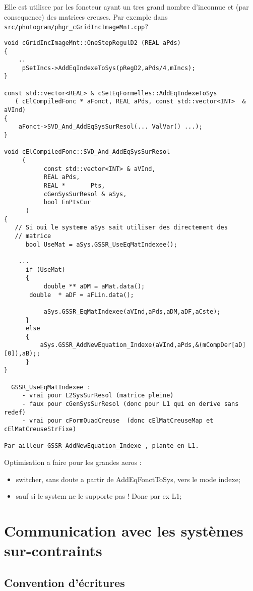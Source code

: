 Elle est utilisee par les foncteur ayant un tres grand nombre d'inconnue
et (par consequence) des matrices creuses. Par exemple dans
{\tt src/photogram/phgr\_cGridIncImageMnt.cpp}?


{\small
\begin{verbatim}
void cGridIncImageMnt::OneStepRegulD2 (REAL aPds)
{
    ..
     pSetIncs->AddEqIndexeToSys(pRegD2,aPds/4,mIncs);
}

const std::vector<REAL> & cSetEqFormelles::AddEqIndexeToSys
   ( cElCompiledFonc * aFonct, REAL aPds, const std::vector<INT>  & aVInd)
{
    aFonct->SVD_And_AddEqSysSurResol(... ValVar() ...);
}

void cElCompiledFonc::SVD_And_AddEqSysSurResol
     (
           const std::vector<INT> & aVInd,
           REAL aPds,
           REAL *       Pts,
           cGenSysSurResol & aSys,
           bool EnPtsCur
      )
{
   // Si oui le systeme aSys sait utiliser des directement des
   // matrice
      bool UseMat = aSys.GSSR_UseEqMatIndexee();

    ...
      if (UseMat)
      {
           double ** aDM = aMat.data();
	   double  * aDF = aFLin.data();

           aSys.GSSR_EqMatIndexee(aVInd,aPds,aDM,aDF,aCste);
      }
      else
      {
          aSys.GSSR_AddNewEquation_Indexe(aVInd,aPds,&(mCompDer[aD][0]),aB);;
      }
}

  GSSR_UseEqMatIndexee :
     - vrai pour L2SysSurResol (matrice pleine)
     - faux pour cGenSysSurResol (donc pour L1 qui en derive sans redef)
     - vrai pour cFormQuadCreuse  (donc cElMatCreuseMap et cElMatCreuseStrFixe)

Par ailleur GSSR_AddNewEquation_Indexe , plante en L1.
\end{verbatim}
}

Optimisation a faire pour les grandes aeros :

\begin{itemize}
   \item   switcher, sans doute a partir de AddEqFonctToSys, vers le
   mode indexe;
    \item sauf si le system ne le supporte pas ! Donc par ex L1;
\end{itemize}


\section{Communication avec les syst\`emes sur-contraints}

\subsection{Convention d'\'ecritures}

